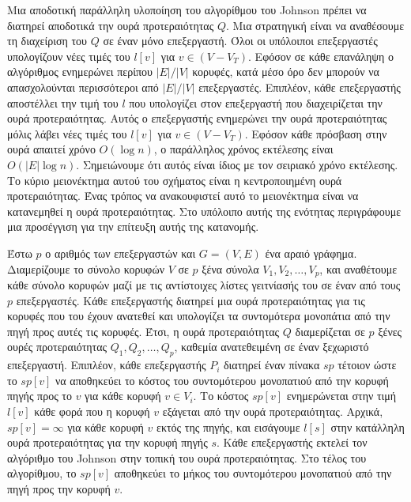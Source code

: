 \documentclass[12pt,a4paper]{article}
\begin{document}
Μια αποδοτική παράλληλη υλοποίηση του αλγορίθμου του \foreignlanguage{english}{Johnson} πρέπει να
διατηρεί αποδοτικά την ουρά προτεραιότητας $Q$. Μια στρατηγική είναι να
αναθέσουμε τη διαχείριση του $Q$ σε έναν μόνο επεξεργαστή. Όλοι οι
υπόλοιποι επεξεργαστές υπολογίζουν νέες τιμές του $l[v]$ για
$v \in (V - V_T)$. Εφόσον σε κάθε επανάληψη ο αλγόριθμος ενημερώνει
περίπου $|E|/|V|$ κορυφές, κατά μέσο όρο δεν μπορούν να απασχολούνται
περισσότεροι από $|E|/|V|$ επεξεργαστές. Επιπλέον, κάθε επεξεργαστής
αποστέλλει την τιμή του $l$ που υπολογίζει στον επεξεργαστή που διαχειρίζεται
την ουρά προτεραιότητας. Αυτός ο επεξεργαστής ενημερώνει την ουρά
προτεραιότητας μόλις λάβει νέες τιμές του $l[v]$ για $v \in (V - V_T)$.
Εφόσον κάθε πρόσβαση στην ουρά απαιτεί χρόνο $O(\log n)$, ο παράλληλος
χρόνος εκτέλεσης είναι $O(|E| \log n)$. Σημειώνουμε ότι αυτός είναι ίδιος
με τον σειριακό χρόνο εκτέλεσης. Το κύριο μειονέκτημα αυτού του σχήματος
είναι η κεντροποιημένη ουρά προτεραιότητας. Ένας τρόπος να ανακουφιστεί
αυτό το μειονέκτημα είναι να κατανεμηθεί η ουρά προτεραιότητας. Στο
υπόλοιπο αυτής της ενότητας περιγράφουμε μια προσέγγιση για την επίτευξη
αυτής της κατανομής.

Έστω $p$ ο αριθμός των επεξεργαστών και $G = (V, E)$ ένα αραιό γράφημα.
Διαμερίζουμε το σύνολο κορυφών $V$ σε $p$ ξένα σύνολα $V_1, V_2, \ldots,
V_p$, και αναθέτουμε κάθε σύνολο κορυφών μαζί με τις αντίστοιχες λίστες
γειτνίασής του σε έναν από τους $p$ επεξεργαστές. Κάθε επεξεργαστής
διατηρεί μια ουρά προτεραιότητας για τις κορυφές που του έχουν ανατεθεί
και υπολογίζει τα συντομότερα μονοπάτια από την πηγή προς αυτές τις
κορυφές. Έτσι, η ουρά προτεραιότητας $Q$ διαμερίζεται σε $p$ ξένες ουρές
προτεραιότητας $Q_1, Q_2, \ldots, Q_p$, καθεμία ανατεθειμένη σε έναν
ξεχωριστό επεξεργαστή. Επιπλέον, κάθε επεξεργαστής $P_i$ διατηρεί έναν
πίνακα $sp$ τέτοιον ώστε το $sp[v]$ να αποθηκεύει το κόστος του
συντομότερου μονοπατιού από την κορυφή πηγής προς το $v$ για κάθε κορυφή
$v \in V_i$. Το κόστος $sp[v]$ ενημερώνεται στην τιμή $l[v]$ κάθε φορά
που η κορυφή $v$ εξάγεται από την ουρά προτεραιότητας. Αρχικά,
$sp[v] = \infty$ για κάθε κορυφή $v$ εκτός της πηγής, και εισάγουμε
$l[s]$ στην κατάλληλη ουρά προτεραιότητας για την κορυφή πηγής $s$.
Κάθε επεξεργαστής εκτελεί τον αλγόριθμο του \foreignlanguage{english}{Johnson} στην τοπική του
ουρά προτεραιότητας. Στο τέλος του αλγορίθμου, το $sp[v]$ αποθηκεύει
το μήκος του συντομότερου μονοπατιού από την πηγή προς την κορυφή $v$.
\end{document}
